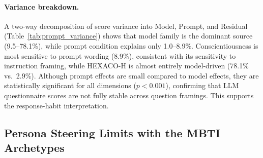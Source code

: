 \documentclass[11pt]{article}
\begin{document}
\paragraph{Variance breakdown.}
A two-way decomposition of score variance into Model, Prompt, and Residual (Table~\ref{tab:prompt_variance}) shows that model family is the dominant source (9.5--78.1\%), while prompt condition explains only 1.0--8.9\%.
Conscientiousness is most sensitive to prompt wording (8.9\%), consistent with its sensitivity to instruction framing, while HEXACO-H is almost entirely model-driven (78.1\% vs.\ 2.9\%).
Although prompt effects are small compared to model effects, they are statistically significant for all dimensions ($p < 0.001$), confirming that LLM questionnaire scores are not fully stable across question framings. This supports the response-habit interpretation.

\begin{table}[!htb]
\centering
\caption{Variance decomposition: percentage of total score variance attributable to Model family, Prompt condition, and Residual, for all 15 models.}
\label{tab:prompt_variance}
\end{table}

\subsection{Persona Steering Limits with the MBTI Archetypes}
\label{sec:mbti}
\end{document}
